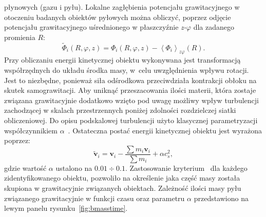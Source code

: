 płynowych (gazu i pyłu).  Lokalne zagłębienia potencjału grawitacyjnego w
otoczeniu badanych obiektów pyłowych można obliczyć, poprzez odjęcie potencjału
grawitacyjnego uśrednionego w płaszczyźnie \emph{z-$\varphi$} dla zadanego
promienia $R$:
%
\begin{equation}
   \tilde{\Phi}_i(R,\varphi,z) = \Phi_i(R,\varphi,z) -
   \left<\Phi_i\right>_{z\varphi}(R).
\end{equation}
%
Przy obliczaniu energii kinetycznej obiektu wykonywana jest transformacją
współrzędnych do układu środka masy, w~celu uwzględnienia wpływu rotacji.
Jest to niezbędne, ponieważ siła odśrodkowa przeciwdziała kontrakcji obłoku na
skutek samograwitacji. Aby uniknąć przeszacowania ilości materii, która zostaje
związana grawitacyjnie dodatkowo wzięto pod uwagę możliwy wpływ turbulencji
zachodzącej w skalach przestrzennych poniżej zdolności rozdzielczej siatki
obliczeniowej. Do opisu podskalowej turbulencji użyto klasycznej parametryzacji
współczynnikiem $\alpha$~\cite{SS73}. Ostateczna postać energii kinetycznej
obiektu jest wyrażona poprzez:
%
\begin{equation}
   \label{eq:ekin}
   \tilde{\mathbf{v}}_i = \mathbf{v}_i - \frac{\sum m_i \mathbf{v}_i}{\sum m_i}
   + \alpha c_s^2,
\end{equation}
%
gdzie wartość $\alpha$ ustalono na $0.01 \div 0.1$. Zastosowanie
kryterium~ dla każdego zidentyfikowanego obiektu, pozwoliło na
określenie jaka część masy została skupiona w grawitacyjnie związanych
obiektach. Zależność ilości masy pyłu związanego grawitacyjnie w funkcji czasu
oraz parametru $\alpha$ przedstawiono na lewym panelu rysunku~\ref{fig:bmasstime}.
%
